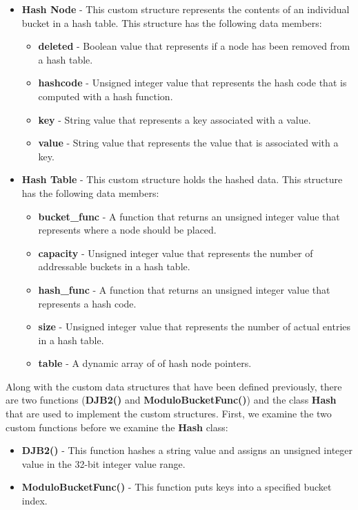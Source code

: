 \begin{itemize}
    \item \textbf{Hash Node} - This custom structure represents the contents of an individual bucket in a hash table. This structure has the following data members:
    \begin{itemize}
        \item \textbf{deleted} - Boolean value that represents if a node has been removed from a hash table.
        \item \textbf{hashcode} - Unsigned integer value that represents the hash code that is computed with a hash function.
        \item \textbf{key} - String value that represents a key associated with a value.
        \item \textbf{value} - String value that represents the value that is associated with a key.
    \end{itemize}
    \item \textbf{Hash Table} - This custom structure holds the hashed data. This structure has the following data members:
    \begin{itemize}
        \item \textbf{bucket\_func} - A function that returns an unsigned integer value that represents where a node should be placed.
        \item \textbf{capacity} - Unsigned integer value that represents the number of addressable buckets in a hash table.
        \item \textbf{hash\_func} - A function that returns an unsigned integer value that represents a hash code.
        \item \textbf{size} - Unsigned integer value that represents the number of actual entries in a hash table.
        \item \textbf{table} - A dynamic array of of hash node pointers.
    \end{itemize}
\end{itemize}

\noindent Along with the custom data structures that have been defined previously, there are two functions (\textbf{DJB2()} and \textbf{ModuloBucketFunc()}) and the class \textbf{Hash} that are used to implement 
the custom structures. First, we examine the two custom functions before we examine the \textbf{Hash} class:

\begin{itemize}
    \item \textbf{DJB2()} - This function hashes a string value and assigns an unsigned integer value in the 32-bit integer value range.
    \item \textbf{ModuloBucketFunc()} - This function puts keys into a specified bucket index.
\end{itemize}

